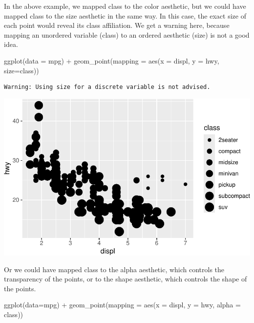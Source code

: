 \documentclass[
  letterpaper,
  DIV=11,
  numbers=noendperiod]{scrreprt}
\newenvironment{Shaded}{\begin{snugshade}}{\end{snugshade}}
\newcommand{\AttributeTok}[1]{\textcolor[rgb]{0.40,0.45,0.13}{#1}}
\newcommand{\FunctionTok}[1]{\textcolor[rgb]{0.28,0.35,0.67}{#1}}
\newcommand{\NormalTok}[1]{\textcolor[rgb]{0.00,0.23,0.31}{#1}}
\newcommand{\SpecialCharTok}[1]{\textcolor[rgb]{0.37,0.37,0.37}{#1}}
\begin{document}
In the above example, we mapped class to the color aesthetic, but we
could have mapped class to the size aesthetic in the same way. In this
case, the exact size of each point would reveal its class affiliation.
We get a warning here, because mapping an unordered variable (class) to
an ordered aesthetic (size) is not a good idea.

\begin{Shaded}
\begin{Highlighting}[]
\FunctionTok{ggplot}\NormalTok{(}\AttributeTok{data =}\NormalTok{ mpg) }\SpecialCharTok{+}
  \FunctionTok{geom\_point}\NormalTok{(}\AttributeTok{mapping =} \FunctionTok{aes}\NormalTok{(}\AttributeTok{x =}\NormalTok{ displ, }\AttributeTok{y =}\NormalTok{ hwy, }\AttributeTok{size=}\NormalTok{class))}
\end{Highlighting}
\end{Shaded}

\begin{verbatim}
Warning: Using size for a discrete variable is not advised.
\end{verbatim}

\includegraphics{Beginning_Data_Visualization_files/figure-pdf/Example2-1.pdf}

Or we could have mapped class to the alpha aesthetic, which controls the
transparency of the points, or to the shape aesthetic, which controls
the shape of the points.

\begin{Shaded}
\begin{Highlighting}[]
\FunctionTok{ggplot}\NormalTok{(}\AttributeTok{data=}\NormalTok{mpg) }\SpecialCharTok{+}
  \FunctionTok{geom\_point}\NormalTok{(}\AttributeTok{mapping =} \FunctionTok{aes}\NormalTok{(}\AttributeTok{x =}\NormalTok{ displ, }\AttributeTok{y =}\NormalTok{ hwy, }\AttributeTok{alpha =}\NormalTok{ class))}
\end{Highlighting}
\end{Shaded}
\end{document}
